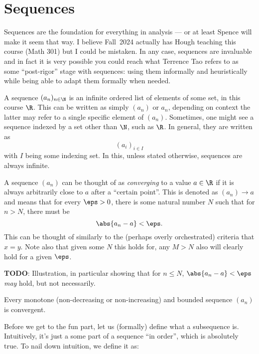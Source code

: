 \documentclass{article}
\newcommand{\todo}{\textbf{TODO}: }
\begin{document}
\section*{Sequences}

Sequences are the foundation for everything in analysis --- or at least Spence will make it seem that way.
I believe Fall~2024 actually has Hough teaching this course (Math 301) but I could be mistaken.
In any case, sequences are invaluable and in fact it is very possible you could reach what
Terrence Tao refers to as some ``post-rigor'' stage with sequences: using them informally and heuristically
while being able to adapt them formally when needed.

\begin{defn}[Sequences]\label{defn:sequence}
  A sequence $(a_{n})_{n \in \N}$ is an infinite ordered list of elements of some set, in this course $\R$.
  This can be written as simply $(a_{n})$ or $a_{n}$, depending on context the latter may refer to a single specific element of $(a_{n})$.
  Sometimes, one might see a sequence indexed by a set other than $\N$, such as $\R$. In general, they are written as
  \[ (a_{i})_{i \in I} \]
  with $I$ being some indexing set. In this, unless stated otherwise, sequences are always infinite.
\end{defn}

\begin{defn}\label{defn:convergence}
  A sequence $(a_{n})$ can be thought of as \emph{converging} to a value $a \in \R$ if it is always arbitrarily close
  to $a$ after a ``certain point''. This is denoted as $(a_{n}) \to a$ and means that for every $\eps > 0$,
  there is some natural number $N$ such that for $n > N$, there must be
  \[ \abs{a_{n} - a} < \eps. \]
  This can be thought of similarly to the (perhaps overly orchestrated) criteria that $x = y$.
  Note also that given some $N$ this holds for, any $M > N$ also will clearly hold for a given $\eps$.

  \todo Illustration, in particular showing that for $n \le N$, $\abs{a_{n} - a} < \eps$ \emph{may} hold,
  but not necessarily.
\end{defn}

\begin{theorem}\label{thm:mct}
  Every monotone (non-decreasing or non-increasing) and bounded sequence $(a_{n})$ is convergent.
\end{theorem}

Before we get to the fun part, let us (formally) define what a subsequence is.
Intuitively, it's just a some part of a sequence ``in order'', which is absolutely true.
To nail down intuition, we define it as:
\end{document}
